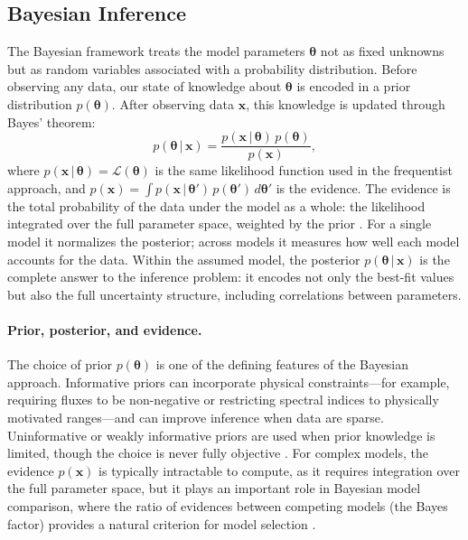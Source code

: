 \subsection{Bayesian Inference}
\label{sec:3.1.3}
The Bayesian framework treats the model parameters $\boldsymbol{\theta}$ not as fixed unknowns but as random variables associated with a probability distribution.
Before observing any data, our state of knowledge about $\boldsymbol{\theta}$ is encoded in a prior distribution $p(\boldsymbol{\theta})$.
After observing data $\mathbf{x}$, this knowledge is updated through Bayes' theorem:
\begin{equation}
	p(\boldsymbol{\theta} \,|\, \mathbf{x}) = \frac{p(\mathbf{x} \,|\, \boldsymbol{\theta}) \, p(\boldsymbol{\theta})}{p(\mathbf{x})},
	\label{eq:bayes}
\end{equation}
where $p(\mathbf{x} \,|\, \boldsymbol{\theta}) = \mathcal{L}(\boldsymbol{\theta})$ is the same likelihood function used in the frequentist approach, and $p(\mathbf{x}) = \int p(\mathbf{x} \,|\, \boldsymbol{\theta}') \, p(\boldsymbol{\theta}') \, d\boldsymbol{\theta}'$ is the evidence.
The evidence is the total probability of the data under the model as a whole: the likelihood integrated over the full parameter space, weighted by the prior \cite{bishop}.
For a single model it normalizes the posterior; across models it measures how well each model accounts for the data.
Within the assumed model, the posterior $p(\boldsymbol{\theta} \,|\, \mathbf{x})$ is the complete answer to the inference problem: it encodes not only the best-fit values but also the full uncertainty structure, including correlations between parameters.

\paragraph{Prior, posterior, and evidence.}

The choice of prior $p(\boldsymbol{\theta})$ is one of the defining features of the Bayesian approach.
Informative priors can incorporate physical constraints---for example, requiring fluxes to be non-negative or restricting spectral indices to physically motivated ranges---and can improve inference when data are sparse.
Uninformative or weakly informative priors are used when prior knowledge is limited, though the choice is never fully objective \cite{Hastie:2009}.
For complex models, the evidence $p(\mathbf{x})$ is typically intractable to compute, as it requires integration over the full parameter space, but it plays an important role in Bayesian model comparison, where the ratio of evidences between competing models (the Bayes factor) provides a natural criterion for model selection \cite{Kass:1995}.

